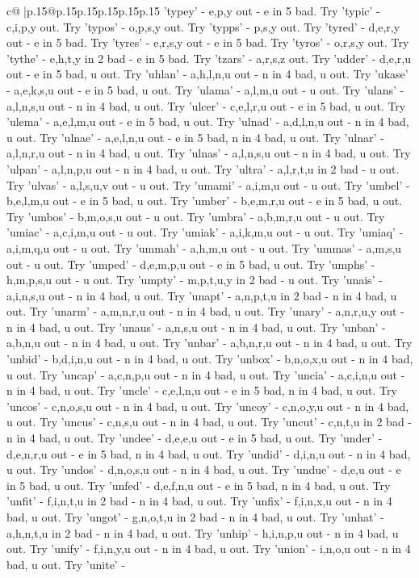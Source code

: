 \documentclass{article}
\begin{document}
{\begin{supertabular}{c@{$\;$}|p{.15\linewidth}@{}p{.15\linewidth}p{.15\linewidth}p{.15\linewidth}p{.15\linewidth}p{.15\linewidth}}
{{{'typey' {-} e,p,y out {-} e in 5 bad. Try 'typic' {-} c,i,p,y out. Try 'typos' {-} o,p,s,y out. Try 'typps' {-} p,s,y out. Try 'tyred' {-} d,e,r,y out {-} e in 5 bad. Try 'tyres' {-} e,r,s,y out {-} e in 5 bad. Try 'tyros' {-} o,r,s,y out. Try 'tythe' {-} e,h,t,y in 2 bad {-} e in 5 bad. Try 'tzars' {-} a,r,s,z out. Try 'udder' {-} d,e,r,u out {-} e in 5 bad, u out. Try 'uhlan' {-} a,h,l,n,u out {-} n in 4 bad, u out. Try 'ukase' {-} a,e,k,s,u out {-} e in 5 bad, u out. Try 'ulama' {-} a,l,m,u out {-} u out. Try 'ulans' {-} a,l,n,s,u out {-} n in 4 bad, u out. Try 'ulcer' {-} c,e,l,r,u out {-} e in 5 bad, u out. Try 'ulema' {-} a,e,l,m,u out {-} e in 5 bad, u out. Try 'ulnad' {-} a,d,l,n,u out {-} n in 4 bad, u out. Try 'ulnae' {-} a,e,l,n,u out {-} e in 5 bad, n in 4 bad, u out. Try 'ulnar' {-} a,l,n,r,u out {-} n in 4 bad, u out. Try 'ulnas' {-} a,l,n,s,u out {-} n in 4 bad, u out. Try 'ulpan' {-} a,l,n,p,u out {-} n in 4 bad, u out. Try 'ultra' {-} a,l,r,t,u in 2 bad {-} u out. Try 'ulvas' {-} a,l,s,u,v out {-} u out. Try 'umami' {-} a,i,m,u out {-} u out. Try 'umbel' {-} b,e,l,m,u out {-} e in 5 bad, u out. Try 'umber' {-} b,e,m,r,u out {-} e in 5 bad, u out. Try 'umbos' {-} b,m,o,s,u out {-} u out. Try 'umbra' {-} a,b,m,r,u out {-} u out. Try 'umiac' {-} a,c,i,m,u out {-} u out. Try 'umiak' {-} a,i,k,m,u out {-} u out. Try 'umiaq' {-} a,i,m,q,u out {-} u out. Try 'ummah' {-} a,h,m,u out {-} u out. Try 'ummas' {-} a,m,s,u out {-} u out. Try 'umped' {-} d,e,m,p,u out {-} e in 5 bad, u out. Try 'umphs' {-} h,m,p,s,u out {-} u out. Try 'umpty' {-} m,p,t,u,y in 2 bad {-} u out. Try 'unais' {-} a,i,n,s,u out {-} n in 4 bad, u out. Try 'unapt' {-} a,n,p,t,u in 2 bad {-} n in 4 bad, u out. Try 'unarm' {-} a,m,n,r,u out {-} n in 4 bad, u out. Try 'unary' {-} a,n,r,u,y out {-} n in 4 bad, u out. Try 'unaus' {-} a,n,s,u out {-} n in 4 bad, u out. Try 'unban' {-} a,b,n,u out {-} n in 4 bad, u out. Try 'unbar' {-} a,b,n,r,u out {-} n in 4 bad, u out. Try 'unbid' {-} b,d,i,n,u out {-} n in 4 bad, u out. Try 'unbox' {-} b,n,o,x,u out {-} n in 4 bad, u out. Try 'uncap' {-} a,c,n,p,u out {-} n in 4 bad, u out. Try 'uncia' {-} a,c,i,n,u out {-} n in 4 bad, u out. Try 'uncle' {-} c,e,l,n,u out {-} e in 5 bad, n in 4 bad, u out. Try 'uncos' {-} c,n,o,s,u out {-} n in 4 bad, u out. Try 'uncoy' {-} c,n,o,y,u out {-} n in 4 bad, u out. Try 'uncus' {-} c,n,s,u out {-} n in 4 bad, u out. Try 'uncut' {-} c,n,t,u in 2 bad {-} n in 4 bad, u out. Try 'undee' {-} d,e,e,u out {-} e in 5 bad, u out. Try 'under' {-} d,e,n,r,u out {-} e in 5 bad, n in 4 bad, u out. Try 'undid' {-} d,i,n,u out {-} n in 4 bad, u out. Try 'undos' {-} d,n,o,s,u out {-} n in 4 bad, u out. Try 'undue' {-} d,e,u out {-} e in 5 bad, u out. Try 'unfed' {-} d,e,f,n,u out {-} e in 5 bad, n in 4 bad, u out. Try 'unfit' {-} f,i,n,t,u in 2 bad {-} n in 4 bad, u out. Try 'unfix' {-} f,i,n,x,u out {-} n in 4 bad, u out. Try 'ungot' {-} g,n,o,t,u in 2 bad {-} n in 4 bad, u out. Try 'unhat' {-} a,h,n,t,u in 2 bad {-} n in 4 bad, u out. Try 'unhip' {-} h,i,n,p,u out {-} n in 4 bad, u out. Try 'unify' {-} f,i,n,y,u out {-} n in 4 bad, u out. Try 'union' {-} i,n,o,u out {-} n in 4 bad, u out. Try 'unite' {-} }}}
\end{supertabular}}
\end{document}
